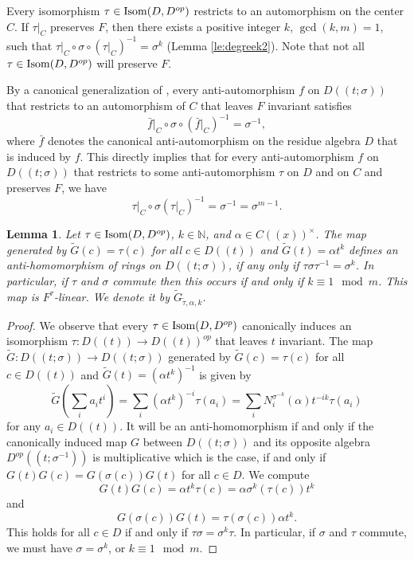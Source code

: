 \documentclass{amsart}
\theoremstyle{plain}
\newtheorem{lemma}[theorem]{Lemma}
\theoremstyle{definition}
\numberwithin{equation}{section}
\numberwithin{figure}{section}
\begin{document}
  Every isomorphism $\tau\in {\rm Isom}(D, D^{op})$  restricts to an automorphism on the center $C$. If $\tau|_C $ preserves $F$, then there exists a positive integer $k$, $\gcd(k,m)=1$, 
  such that $\tau|_C \circ \sigma \circ (\tau|_C )^{-1}=\sigma^k$ (Lemma \ref{le:degreek2}). Note that not all  $\tau\in {\rm Isom}(D, D^{op})$ will preserve $F$.


  By a canonical generalization of \cite[Proposition 4.3]{MST}, every anti-automorphism $f$ on $D((t;\sigma))$ that restricts to an automorphism of $C$ that leaves $F$ invariant  satisfies  
  $$\bar f|_C \circ \sigma \circ (\bar f|_C)^{-1}=\sigma^{-1},$$
   where $\bar f$ denotes the canonical anti-automorphism on the residue algebra $D$ that is induced by $f$.
This directly implies that for every anti-automorphism $f$ on $D((t;\sigma))$ that restricts to some anti-automorphism $\tau$ on $D$ and on $C$ and preserves $F$, we have  
$$\tau|_C \circ \sigma (\tau|_C)^{-1}=\sigma^{-1}=\sigma^{m-1}.$$


\begin{lemma}  \label{le:Ktsigmatoitself3}
    Let $\tau\in {\rm Isom}(D,D^{op})$, $k\in \mathbb{N}$, and $\alpha\in C((x))^\times$.  The map generated by $\widetilde G(c)=\tau(c)$ for all
    $c\in D((t))$ and $\widetilde  G(t)=\alpha t^k$ defines an anti-homomorphism of rings on $D((t;\sigma))$, if any only if  $\tau\sigma  \tau^{-1}=\sigma^k$.
     In particular, if $\tau$ and $\sigma$ commute then this occurs if and only if $k\equiv 1 \mod m$.
This map is $F^\tau$-linear. We denote it by $\widetilde G_{\tilde \tau,\alpha,k}$.
\end{lemma}

\begin{proof}
We observe that every  $\tau\in {\rm Isom}(D,D^{op})$ canonically induces an isomorphism  $\tau:D((t))\to D((t))^{op}$ that leaves $t$ invariant.
The map $\widetilde  G:D((t;\sigma)) \to D((t;\sigma))$ generated by $\widetilde G(c)=\tau(c)$ for all $c\in D((t))$ and $\widetilde  G(t)=(\alpha t^{k})^{-1}$ is given by
$$
\widetilde  G(\sum_{i} a_i t^i) = \sum_{i} (\alpha t^k)^{-i}   \tau(a_i) = \sum_i  N_i^{\sigma^{-k}}(\alpha) t^{-ik}\tau(a_i)
$$
for any $a_i\in D((t))$.
 It will be an anti-homomorphism if and only if  the canonically induced  map $G$ between $ D((t;\sigma))$ and its opposite algebra $ D^{op}((t;\sigma^{-1}))$ is multiplicative which is the case, if and only if  $G(t)G(c)=G(\sigma(c))G(t)$ for all $c\in D$.
 We compute
$$
G(t)G(c)=\alpha t^{k} \tau(c) = \alpha \sigma^{k}(\tau(c)) t^{k}
$$
and
$$
G(\sigma(c))G(t)=\tau(\sigma(c))\alpha t^{k}.
$$
This holds for all $c\in D$ if and only if $\tau\sigma=\sigma^{k}\tau$.
 In particular, if $\sigma$ and $\tau$ commute, we must have $\sigma=\sigma^{k}$, or  $k\equiv 1 \mod m$.
\end{proof}
\end{document}
